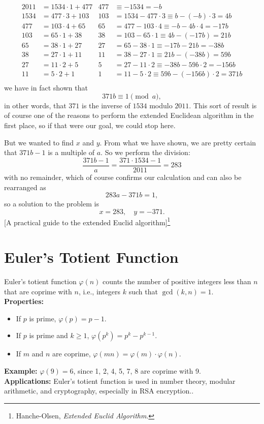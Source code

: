 \[
\begin{aligned}
2011 &= 1534 \cdot 1 + 477 & 477 &\equiv -1534 = -b \\
1534 &= 477 \cdot 3 + 103 & 103 &= 1534 - 477 \cdot 3 \equiv b - (-b)\cdot 3 = 4b \\
477 &= 103 \cdot 4 + 65 & 65 &= 477 - 103 \cdot 4 \equiv -b - 4b \cdot 4 = -17b \\
103 &= 65 \cdot 1 + 38 & 38 &= 103 - 65 \cdot 1 \equiv 4b - (-17b) = 21b \\
65 &= 38 \cdot 1 + 27 & 27 &= 65 - 38 \cdot 1 \equiv -17b - 21b = -38b \\
38 &= 27 \cdot 1 + 11 & 11 &= 38 - 27 \cdot 1 \equiv 21b - (-38b) = 59b \\
27 &= 11 \cdot 2 + 5 & 5 &= 27 - 11 \cdot 2 \equiv -38b - 59b \cdot 2 = -156b \\
11 &= 5 \cdot 2 + 1 & 1 &= 11 - 5 \cdot 2 \equiv 59b - (-156b)\cdot 2 = 371b \\
\end{aligned}
\]
 we have in fact shown that
\[
371b \equiv 1 \pmod{a},
\]
in other words, that $371$ is the inverse of $1534$ modulo $2011$. This sort of result is of
course one of the reasons to perform the extended Euclidean algorithm in the first
place, so if that were our goal, we could stop here.

But we wanted to find $x$ and $y$. From what we have shown, we are pretty certain
that $371b - 1$ is a multiple of $a$. So we perform the division:
\[
\frac{371b - 1}{a} = \frac{371 \cdot 1534 - 1}{2011} = 283
\]
with no remainder, which of course confirms our calculation and can also be rearranged as
\[
283a - 371b = 1,
\]
so a solution to the problem is
\[
x = 283, \quad y = -371.
\]
[A practical guide to the extended Euclid algorithm]\footnote{Hanche-Olsen, \textit{Extended Euclid Algorithm}.}

\section{Euler's Totient Function}
Euler's totient function $\varphi(n)$ counts the number of positive integers less than $n$ that are coprime with $n$, i.e., integers $k$ such that $\gcd(k,n) = 1$.
\vspace{1em}\\
\textbf{Properties:}
\begin{itemize}
    \item If $p$ is prime, $\varphi(p) = p-1$.
    \item If $p$ is prime and $k \ge 1$, $\varphi(p^k) = p^k - p^{k-1}$.
    \item If $m$ and $n$ are coprime, $\varphi(mn) = \varphi(m) \cdot \varphi(n)$.
\end{itemize}
\vspace{1em}
\textbf{Example:} $\varphi(9) = 6$, since 1, 2, 4, 5, 7, 8 are coprime with 9.
\vspace{1em}
\\ \textbf{Applications:}  
Euler's totient function is used in number theory, modular arithmetic, and cryptography, especially in RSA encryption..

